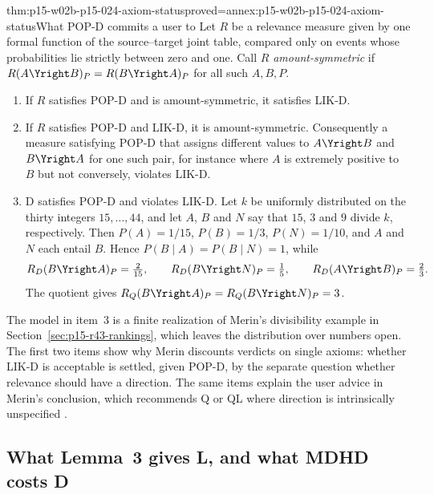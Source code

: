 \begin{hbtheorem}{thm:p15-w02b-p15-024-axiom-status}{proved=annex:p15-w02b-p15-024-axiom-status}{What POP-D commits a user to}
Let \(R\) be a relevance measure given by one formal function of the
source--target joint table, compared only on events whose probabilities
lie strictly between zero and one. Call \(R\) \emph{amount-symmetric}
if \(R(A\Yright B)_P=R(B\Yright A)_P\) for all such \(A,B,P\).
\begin{enumerate}
\item If \(R\) satisfies POP-D and is amount-symmetric, it satisfies
  LIK-D.
\item If \(R\) satisfies POP-D and LIK-D, it is amount-symmetric.
  Consequently a measure satisfying POP-D that assigns different values
  to \(A\Yright B\) and \(B\Yright A\) for one such pair, for instance
  where \(A\) is extremely positive to \(B\) but not conversely,
  violates LIK-D.
\item D satisfies POP-D and violates LIK-D. Let \(k\) be uniformly
  distributed on the thirty integers \(15,\ldots,44\), and let \(A\),
  \(B\) and \(N\) say that \(15\), \(3\) and \(9\) divide \(k\),
  respectively. Then \(P(A)=1/15\), \(P(B)=1/3\), \(P(N)=1/10\), and
  \(A\) and \(N\) each entail \(B\). Hence
  \(P(B\mid A)=P(B\mid N)=1\), while
  \[
   R_D(B\Yright A)_P=\tfrac{2}{15},\qquad
   R_D(B\Yright N)_P=\tfrac15,\qquad
   R_D(A\Yright B)_P=\tfrac23 .
  \]
  The quotient gives \(R_Q(B\Yright A)_P=R_Q(B\Yright N)_P=3\).
\end{enumerate}
\end{hbtheorem}

The model in item~3 is a finite realization of Merin's divisibility
example in Section~\ref{sec:p15-r43-rankings}, which leaves the
distribution over numbers open. The first two items show why Merin
discounts verdicts on single axioms: whether LIK-D is acceptable is
settled, given POP-D, by the separate question whether relevance should
have a direction. The same items explain the user advice in Merin's
conclusion, which recommends Q or QL where direction is intrinsically
unspecified \cite[p.~274]{Merin2021Relevance}.

\subsection{What Lemma~3 gives L, and what MDHD costs D}
\label{sec:p15-w02b-p15-024-lemma3}

